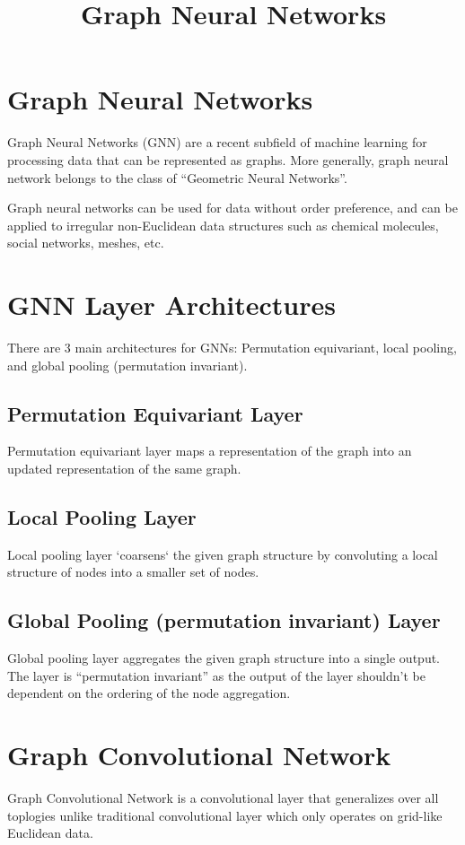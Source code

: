 \documentclass[12pt]{article}
\begin{document}
\title{Graph Neural Networks}

\maketitle


\section{Graph Neural Networks}
Graph Neural Networks (GNN) are a recent subfield of machine learning for processing data that can be represented as graphs. More generally, graph neural network belongs to the class of ``Geometric Neural Networks''.

Graph neural networks can be used for data without order preference, and can be applied to irregular non-Euclidean data structures such as chemical molecules, social networks, meshes, etc.

\section{GNN Layer Architectures}
There are 3 main architectures for GNNs: Permutation equivariant, local pooling, and global pooling (permutation invariant).
\subsection{Permutation Equivariant Layer}
Permutation equivariant layer maps a representation of the graph into an updated representation of the same graph.
\subsection{Local Pooling Layer}
Local pooling layer `coarsens` the given graph structure by convoluting a local structure of nodes into a smaller set of nodes.
\subsection{Global Pooling (permutation invariant) Layer}
Global pooling layer aggregates the given graph structure into a single output. The layer is ``permutation invariant'' as the output of the layer shouldn't be dependent on the ordering of the node aggregation.

\section{Graph Convolutional Network}
Graph Convolutional Network is a convolutional layer that generalizes over all toplogies unlike traditional convolutional layer which only operates on grid-like Euclidean data.
\end{document}
